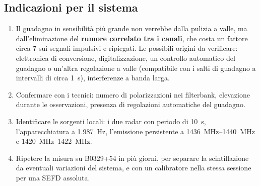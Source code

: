 \subsection{Indicazioni per il sistema}
\begin{enumerate}
  \item Il guadagno in sensibilità più grande non verrebbe dalla pulizia a valle, ma dall'eliminazione del
    \textbf{rumore correlato tra i canali}, che costa un fattore circa 7 sui segnali impulsivi e ripiegati. Le possibili
    origini da verificare: elettronica di conversione, digitalizzazione, un controllo automatico del guadagno o
    un'altra regolazione a valle (compatibile con i salti di guadagno a intervalli di circa \SI{1}{\second}),
    interferenze a banda larga.
  \item Confermare con i tecnici: numero di polarizzazioni nei filterbank, elevazione durante le osservazioni, presenza
    di regolazioni automatiche del guadagno.
  \item Identificare le sorgenti locali: i due radar con periodo di \SI{10}{\second}, l'apparecchiatura a
    \SI{1.987}{\hertz}, l'emissione persistente a \SIrange{1436}{1440}{\mega\hertz} e \SIrange{1420}{1422}{\mega\hertz}.
  \item Ripetere la misura su B0329+54 in più giorni, per separare la scintillazione da eventuali variazioni del
    sistema, e con un calibratore nella stessa sessione per una SEFD assoluta.
\end{enumerate}
